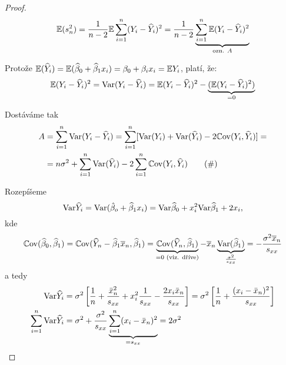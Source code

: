 \begin{proof}
	\begin{equation*}
		\mathbb{E}(s_n^2)  = \frac{1}{n-2} \mathbb{E} \sum_{i=1}^{n} (Y_i - \widehat{Y}_i)^2 = \frac{1}{n-2} \underbrace{\sum\limits_{i=1}^{n} \mathbb{E} (Y_i - \widehat{Y}_i)^2}_{\text{ozn. } A}
	\end{equation*}
	
	Protože $\mathbb{E}(\widehat{Y}_i)  = \mathbb{E}(\widehat{\beta}_0 + \widehat{\beta}_1 x_i) = \beta_0 + \beta_i x_i = \mathbb{E} Y_i$, platí, že:
	\begin{equation*}
	\mathbb{E}(Y_i - \widehat{Y}_i)^2   = \mathrm{Var}(Y_i - \widehat{Y}_i) = \mathbb{E} (Y_i - \widehat{Y}_i)^2 - \underbrace{(\mathbb{E}(Y_i - \widehat{Y}_i)^2)}_{= 0}
	\end{equation*}
	
	Dostáváme tak	
	\begin{align*}
		A & = \sum_{i=1}^{n} \mathrm{Var}(Y_i - \widehat{Y}_i) = \sum_{i=1}^n [ \mathrm{Var}(Y_i) + \mathrm{Var}(\widehat{Y}_i) - 2 \mathbb{C}\mathrm{ov}(Y_i, \widehat{Y}_i) ] =  \\
		& = n \sigma^2 + \sum_{i=1}^n \mathrm{Var}(\widehat{Y}_i) - 2 \sum_{i=1}^n \mathbb{C}\mathrm{ov}(Y_i, \widehat{Y}_i) \tag{$\#$}
	\end{align*}
	
	Rozepíšeme
	\begin{equation*}
		\mathrm{Var} \widehat{Y}_i  = \mathrm{Var}(\hat{\beta}_o + \widehat{\beta}_1 x_i) = \mathrm{Var} \widehat{\beta}_0 + x_i^2 \mathrm{Var} \widehat{\beta}_1 + 2 x_i,
	\end{equation*}
	kde
	\begin{equation*}
		\mathbb{C}\mathrm{ov}(\widehat{\beta}_0, \widehat{\beta}_1) = \mathbb{C}\mathrm{ov}(\widehat{Y}_n - \widehat{\beta}_1 \overline{x}_n, \widehat{\beta}_1) = \underbrace{\mathbb{C}\mathrm{ov}(\widehat{Y}_n, \widehat{\beta}_1)}_{= 0 \text{ (viz. dříve)}} - \overline{x}_n \underbrace{\mathrm{Var}(\widehat{\beta}_1)}_{\frac{\sigma^2}{s_{xx}}} = -\frac{\sigma^2 \overline{x}_n}{s_{xx}}
	\end{equation*}
	a tedy
	\begin{align*}
		\mathrm{Var} \widehat{Y}_i & = \sigma^2 \left[ \frac{1}{n} + \frac{\bar{x}_n^2}{s_{xx}} + x_i^2 \frac{1}{s_{xx}} - \frac{2 x_i \bar{x}_n}{s_{xx}} \right] = \sigma^2 \left[ \frac{1}{n} + \frac{(x_i - \bar{x}_n)^2}{s_{xx}}\right] \\
		\sum_{i=1}^n \mathrm{Var} \widehat{Y}_i & = \sigma^2 + \frac{\sigma^2}{s_{xx}} \underbrace{\sum_{i=1}^n (x_i - \bar{x}_n)^2}_{ = s_{xx}} = 2\sigma^2
	\end{align*}
	

\end{proof}
